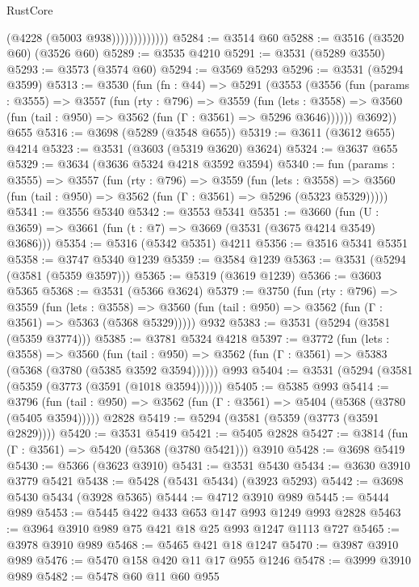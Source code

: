 \begin{lexlean}{RustCore}
\begin{coremodule}
                          (@4228 (@5003 @938)))))))))))))
@5284 := @3514 @60
@5288 := @3516 (@3520 @60) (@3526 @60)
@5289 := @3535 @4210
@5291 := @3531 (@5289 @3550)
@5293 := @3573 (@3574 @60)
@5294 := @3569 @5293
@5296 := @3531 (@5294 @3599)
@5313 := @3530
    (fun (fn : @44) =>
    @5291
      (@3553
        (@3556
          (fun (params : @3555) =>
          @3557
            (fun (rty : @796) =>
            @3559
              (fun (lets : @3558) =>
              @3560 (fun (tail : @950) => @3562 (fun (Γ : @3561) => @5296 @3646))))))
        @3692))
    @655
@5316 := @3698 (@5289 (@3548 @655))
@5319 := @3611 (@3612 @655) @4214
@5323 := @3531 (@3603 (@5319 @3620) @3624)
@5324 := @3637 @655
@5329 := @3634 (@3636 @5324 @4218 @3592 @3594)
@5340 := fun (params : @3555) =>
  @3557
    (fun (rty : @796) =>
    @3559
      (fun (lets : @3558) =>
      @3560 (fun (tail : @950) => @3562 (fun (Γ : @3561) => @5296 (@5323 @5329)))))
@5341 := @3556 @5340
@5342 := @3553 @5341
@5351 := @3660 (fun (U : @3659) => @3661 (fun (t : @7) => @3669 (@3531 (@3675 @4214 @3549) @3686)))
@5354 := @5316 (@5342 @5351) @4211
@5356 := @3516 @5341 @5351
@5358 := @3747 @5340 @1239
@5359 := @3584 @1239
@5363 := @3531 (@5294 (@3581 (@5359 @3597)))
@5365 := @5319 (@3619 @1239)
@5366 := @3603 @5365
@5368 := @3531 (@5366 @3624)
@5379 := @3750
    (fun (rty : @796) =>
    @3559
      (fun (lets : @3558) =>
      @3560 (fun (tail : @950) => @3562 (fun (Γ : @3561) => @5363 (@5368 @5329)))))
    @932
@5383 := @3531 (@5294 (@3581 (@5359 @3774)))
@5385 := @3781 @5324 @4218
@5397 := @3772
    (fun (lets : @3558) =>
    @3560
      (fun (tail : @950) => @3562 (fun (Γ : @3561) => @5383 (@5368 (@3780 (@5385 @3592 @3594))))))
    @993
@5404 := @3531 (@5294 (@3581 (@5359 (@3773 (@3591 (@1018 @3594))))))
@5405 := @5385 @993
@5414 := @3796
    (fun (tail : @950) => @3562 (fun (Γ : @3561) => @5404 (@5368 (@3780 (@5405 @3594)))))
    @2828
@5419 := @5294 (@3581 (@5359 (@3773 (@3591 @2829))))
@5420 := @3531 @5419
@5421 := @5405 @2828
@5427 := @3814 (fun (Γ : @3561) => @5420 (@5368 (@3780 @5421))) @3910
@5428 := @3698 @5419
@5430 := @5366 (@3623 @3910)
@5431 := @3531 @5430
@5434 := @3630 @3910 @3779 @5421
@5438 := @5428 (@5431 @5434) (@3923 @5293)
@5442 := @3698 @5430 @5434 (@3928 @5365)
@5444 := @4712 @3910 @989
@5445 := @5444 @989
@5453 := @5445 @422 @433 @653 @147 @993 @1249 @993 @2828
@5463 := @3964 @3910 @989 @75 @421 @18 @25 @993 @1247 @1113 @727
@5465 := @3978 @3910 @989
@5468 := @5465 @421 @18 @1247
@5470 := @3987 @3910 @989
@5476 := @5470 @158 @420 @11 @17 @955 @1246
@5478 := @3999 @3910 @989
@5482 := @5478 @60 @11 @60 @955

\end{coremodule}
\end{lexlean}
